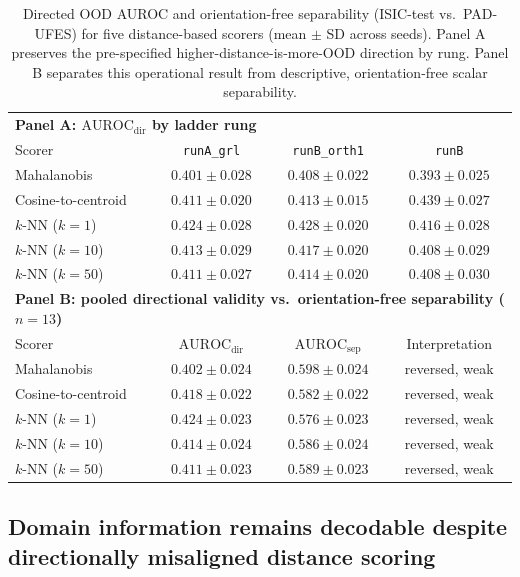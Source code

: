 \begin{table}[t]
\centering
\caption{Directed OOD AUROC and orientation-free separability (ISIC-test vs.\ PAD-UFES) for five distance-based scorers (mean $\pm$ SD across seeds). Panel A preserves the pre-specified higher-distance-is-more-OOD direction by rung. Panel B separates this operational result from descriptive, orientation-free scalar separability.}
\label{tab:five-scorers}
\small
\begin{tabular}{lccc}
\toprule
\multicolumn{4}{l}{\textbf{Panel A: $\mathrm{AUROC}_{\mathrm{dir}}$ by ladder rung}} \\
\addlinespace
Scorer & \texttt{runA\_grl} & \texttt{runB\_orth1} & \texttt{runB} \\
\midrule
Mahalanobis & $0.401 \pm 0.028$ & $0.408 \pm 0.022$ & $0.393 \pm 0.025$ \\
Cosine-to-centroid & $0.411 \pm 0.020$ & $0.413 \pm 0.015$ & $0.439 \pm 0.027$ \\
$k$-NN ($k=1$) & $0.424 \pm 0.028$ & $0.428 \pm 0.020$ & $0.416 \pm 0.028$ \\
$k$-NN ($k=10$) & $0.413 \pm 0.029$ & $0.417 \pm 0.020$ & $0.408 \pm 0.029$ \\
$k$-NN ($k=50$) & $0.411 \pm 0.027$ & $0.414 \pm 0.020$ & $0.408 \pm 0.030$ \\
\midrule
\multicolumn{4}{l}{\textbf{Panel B: pooled directional validity vs.\ orientation-free separability ($n=13$)}} \\
\addlinespace
Scorer & $\mathrm{AUROC}_{\mathrm{dir}}$ & $\mathrm{AUROC}_{\mathrm{sep}}$ & Interpretation \\
\midrule
Mahalanobis & $0.402 \pm 0.024$ & $0.598 \pm 0.024$ & reversed, weak \\
Cosine-to-centroid & $0.418 \pm 0.022$ & $0.582 \pm 0.022$ & reversed, weak \\
$k$-NN ($k=1$) & $0.424 \pm 0.023$ & $0.576 \pm 0.023$ & reversed, weak \\
$k$-NN ($k=10$) & $0.414 \pm 0.024$ & $0.586 \pm 0.024$ & reversed, weak \\
$k$-NN ($k=50$) & $0.411 \pm 0.023$ & $0.589 \pm 0.023$ & reversed, weak \\
\bottomrule
\end{tabular}
\end{table}


\subsection{Domain information remains decodable despite directionally misaligned distance scoring}
\label{sec:decodable}

